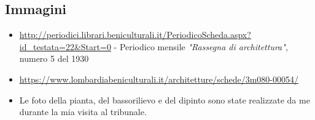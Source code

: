 \documentclass[12pt]{article}
\begin{document}
\subsection{Immagini}
\begin{itemize}
  \item \url{http://periodici.librari.beniculturali.it/PeriodicoScheda.aspx?id\_testata=22\&Start=0} - Periodico mensile \textit{"Rassegna di architettura"}, numero 5 del 1930
  \item \url{https://www.lombardiabeniculturali.it/architetture/schede/3m080-00054/}
  \item Le foto della pianta, del bassorilievo e del dipinto sono state realizzate da me durante la mia visita al tribunale.
\end{itemize}
\end{document}
